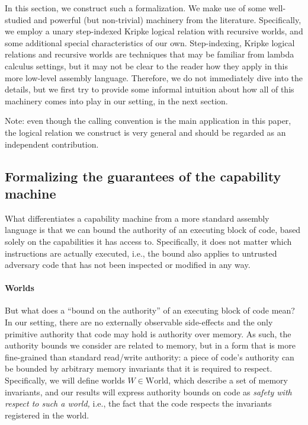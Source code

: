 \documentclass{llncs}
\newcommand{\plaindom}[1]{\mathrm{#1}}
\newcommand{\Worlds}{\plaindom{World}}
\begin{document}
In this section, we construct such a formalization. We make use of some
well-studied and powerful (but non-trivial) machinery from the literature.
Specifically, we employ a unary step-indexed Kripke logical relation with
recursive worlds, and some additional special characteristics of our own.
Step-indexing, Kripke logical relations and recursive worlds are techniques that
may be familiar from lambda calculus settings, but it may not be clear to the
reader how they apply in this more low-level assembly language. Therefore, we do
not immediately dive into the details, but we first try to provide some informal
intuition about how all of this machinery comes into play in our setting, in the
next section.

Note: even though the calling convention is the main application in this paper,
the logical relation we construct is very general and should be regarded as an
independent contribution.

\subsection{Formalizing the guarantees of the capability machine}
\label{sec:formalizing-guarantees}
What differentiates a capability machine from a more standard assembly language
is that we can bound the authority of an executing block of code, based solely
on the capabilities it has access to. Specifically, it does not matter which
instructions are actually executed, i.e., the bound also applies to untrusted
adversary code that has not been inspected or modified in any way.

\paragraph{Worlds}
But what does a ``bound on the authority'' of an executing block of code mean?
In our setting, there are no externally observable side-effects and the only
primitive authority that code may hold is authority over memory. As such, the
authority bounds we consider are related to memory, but in a form that is more
fine-grained than standard read/write authority: a piece of code's authority can be bounded
by arbitrary memory invariants that it is required to respect. Specifically, we
will define worlds $W \in \Worlds$, which describe a set of memory invariants, and
our results will express authority bounds on code as \emph{safety with respect to such
a world,} i.e., the fact that the code respects the invariants registered in
the world.
\end{document}

